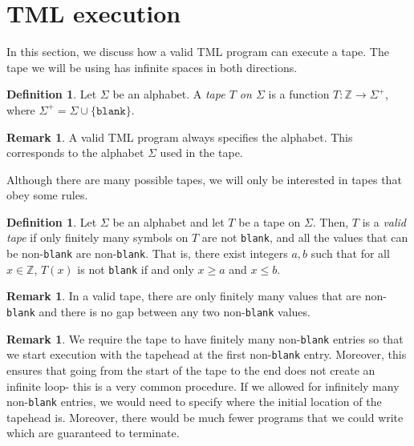\documentclass{article}
\theoremstyle{definition}
\newtheorem{definition}[rules]{Definition}
\newtheorem{remark}[rules]{Remark}
\begin{document}
    \section{TML execution}
    In this section, we discuss how a valid TML program can execute a tape. The tape we will be using has infinite spaces in both directions.
    \begin{definition}
        Let $\Sigma$ be an alphabet. A \emph{tape $T$ on $\Sigma$} is a function $T: \mathbb{Z} \to \Sigma^+$, where $\Sigma^+ = \Sigma \cup \{\texttt{blank}\}$.
    \end{definition}
    \begin{remark}
        A valid TML program always specifies the alphabet. This corresponds to the alphabet $\Sigma$ used in the tape.
    \end{remark}
    \noindent Although there are many possible tapes, we will only be interested in tapes that obey some rules.
    \begin{definition}
        Let $\Sigma$ be an alphabet and let $T$ be a tape on $\Sigma$. Then, $T$ is a \emph{valid tape} if only finitely many symbols on $T$ are not \texttt{blank}, and all the values that can be non-\texttt{blank} are non-\texttt{blank}. That is, there exist integers $a, b$ such that for all $x \in \mathbb{Z}$, $T(x)$ is not \texttt{blank} if and only $x \geq a$ and $x \leq b$.
    \end{definition}
    \begin{remark}
        In a valid tape, there are only finitely many values that are non-\texttt{blank} and there is no gap between any two non-\texttt{blank} values.
    \end{remark}
    \begin{remark}
        We require the tape to have finitely many non-\texttt{blank} entries so that we start execution with the tapehead at the first non-\texttt{blank} entry. Moreover, this ensures that going from the start of the tape to the end does not create an infinite loop- this is a very common procedure. If we allowed for infinitely many non-\texttt{blank} entries, we would need to specify where the initial location of the tapehead is. Moreover, there would be much fewer programs that we could write which are guaranteed to terminate.
    \end{remark}
\end{document}
